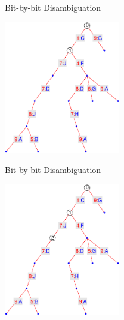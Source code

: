 \addtocounter{framenumber}{-1}
\begin{tframe}{Bit-by-bit Disambiguation}
\begin{center}
\includegraphics[width=2in]{media_minrep/cdiag21}\quad
{}
\end{center}
\end{tframe}

\addtocounter{framenumber}{-1}
\begin{tframe}{Bit-by-bit Disambiguation}
\begin{center}
\includegraphics[width=2in]{media_minrep/cdiag22}\quad
{}
\end{center}
\end{tframe}

